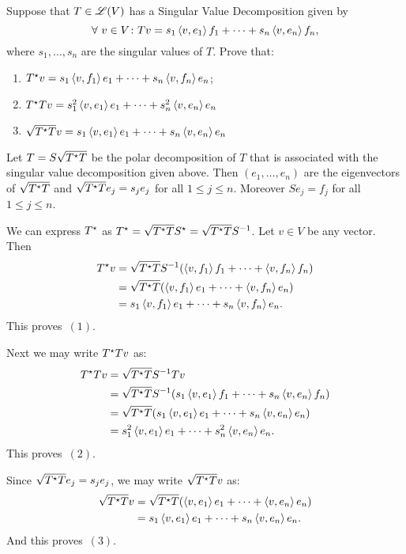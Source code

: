 \begin{exercise}
Suppose that $T \in \mathscr{L}(V)$ has a Singular Value Decomposition given by
\[
    \forall \ v \in V \colon T v =
    s_1 \left \langle v, e_1 \right \rangle f_1 + \cdots + s_n \left \langle v, e_n \right \rangle f_n,
\]
where $s_1, \ldots, s_n$ are the singular values of $T$. Prove that:
\begin{enumerate}
    \item $T^{\star} v = s_1 \left \langle v, f_1 \right \rangle e_1 + \cdots + s_n \left \langle v, f_n \right \rangle e_n$;
    \item $T^{\star} T v = s_1^2 \left \langle v, e_1 \right \rangle e_1 + \cdots + s_n^2 \left \langle v, e_n \right \rangle e_n$
    \item $\sqrt{T^{\star} T} v = s_1 \left \langle v, e_1 \right \rangle e_1 + \cdots + s_n \left \langle v, e_n \right \rangle e_n$
\end{enumerate}
\end{exercise}
\begin{solution}
Let $T = S \sqrt{T^{\star} T}$ be the polar decomposition of $T$ that is associated
with the singular value decomposition given above. Then $(e_1, \ldots, e_n)$ are
the eigenvectors of $\sqrt{T^{\star} T}$ and $\sqrt{T^{\star} T} e_j = s_j e_j$ for
all $1 \leq j \leq n$. Moreover $S e_j = f_j$ for all $1 \leq j \leq n$.

We can express $T^{\star}$ as $T^{\star} = \sqrt{T^{\star} T} S^{\star} = \sqrt{T^{\star} T} S^{-1}$.
Let $v \in V$ be any vector. Then
\begin{align*}
    T^{\star} v & = \sqrt{T^{\star} T} S^{-1} (\left \langle v, f_1 \right \rangle f_1 + \cdots + \left \langle v, f_n \right \rangle f_n) \\
              & = \sqrt{T^{\star} T} (\left \langle v, f_1 \right \rangle e_1 + \cdots + \left \langle v, f_n \right \rangle e_n) \\
              & = s_1 \left \langle v, f_1 \right \rangle e_1 + \cdots + s_n \left \langle v, f_n \right \rangle e_n.
\end{align*}
This proves~$(1)$.

Next we may write $T^{\star} T v$ as:
\begin{align*}
    T^{\star} T v & = \sqrt{T^{\star} T} S^{-1} T v \\
                & = \sqrt{T^{\star} T} S^{-1} (s_1 \left \langle v, e_1 \right \rangle f_1 + \cdots + s_n \left \langle v, e_n \right \rangle f_n) \\
                & = \sqrt{T^{\star} T} (s_1 \left \langle v, e_1 \right \rangle e_1 + \cdots + s_n \left \langle v, e_n \right \rangle e_n) \\
                & = s_1^2 \left \langle v, e_1 \right \rangle e_1 + \cdots + s_n^2 \left \langle v, e_n \right \rangle e_n.
\end{align*}
This proves~$(2)$.

Since $\sqrt{T^{\star} T} e_j = s_j e_j$, we may write $\sqrt{T^{\star} T} v$ as:
\begin{align*}
    \sqrt{T^{\star} T} v & = \sqrt{T^{\star} T} (\left \langle v, e_1 \right \rangle e_1 + \cdots + \left \langle v, e_n \right \rangle e_n) \\
                       & = s_1 \left \langle v, e_1 \right \rangle e_1 + \cdots + s_n \left \langle v, e_n \right \rangle e_n.
\end{align*}
And this proves~$(3)$.
\end{solution}

